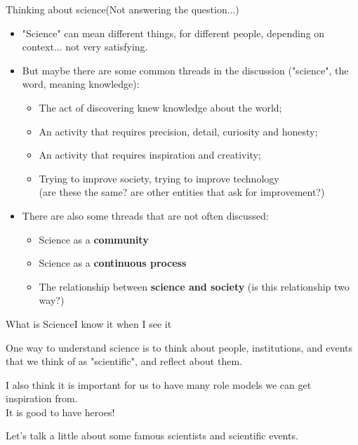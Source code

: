 \begin{frame}{Thinking about science}{(Not answering the question...)}
  \begin{itemize}
    \item "Science" can mean different things, for different people, depending on context... not very satisfying.
    \medskip

    \item But maybe there are some common threads in the discussion
    ("science", the word, meaning knowledge):
    \begin{itemize}
      \item The act of discovering knew knowledge about the world;
      \item An activity that requires precision, detail, curiosity and honesty;
      \item An activity that requires inspiration and creativity;
      \item Trying to improve society, trying to improve technology\\
      (are these the same? are other entities that ask for improvement?)
    \end{itemize}
    \item There are also some threads that are not often discussed:
    \begin{itemize}
      \item Science as a {\bf community}
      \item Science as a {\bf continuous process}
      \item The relationship between {\bf science and society} (is this relationship two way?)
    \end{itemize}
  \end{itemize}
\end{frame}

\begin{frame}{What is Science}{I know it when I see it}

  One way to understand science is to think about people, institutions, and events that we think of as "scientific", and reflect about them.\bigskip 

  \begin{block}{}
    I also think it is important for us to have many role models we can get inspiration from.\\
    It is good to have heroes!
  \end{block}
  \bigskip

  Let's talk a little about some famous scientists and scientific events.
\end{frame}


